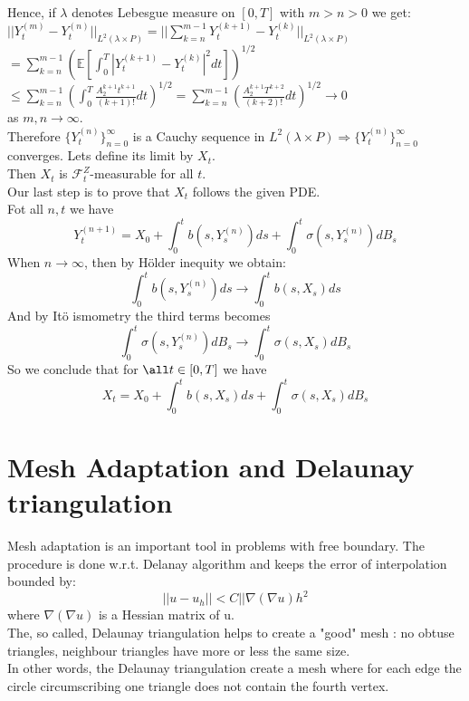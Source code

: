 \documentclass[a4paper]{report}
\begin{document}
\begin{itemize}
Hence, if $\lambda$ denotes Lebesgue measure on $[0,T]$ with $m>n>0$ we get:\\
$||Y_t^{(m)}- Y_t^{(n)}||_{L^2(\lambda \times P)} = ||\sum_{k=n}^{m-1} Y_t^{(k+1)} -Y_t^{(k)} ||_{L^2(\lambda \times P)}$\\
$= \sum_{k=n}^{m-1} (\mathbb{E}[\int_0^T |Y_t^{(k+1)} - Y_t^{(k)} |^2 dt])^{1/2}$\\
$ \leq \sum_{k=n}^{m-1} ( \int_0^T   \frac{A_2^{k+1}t^{k+1}}{(k+1)!} dt)^{1/2} = \sum_{k=n}^{m-1} (  \frac{A_2^{k+1}T^{k+2}}{(k+2)!} dt)^{1/2} \longrightarrow 0$\\
as $m,n \longrightarrow\infty$.\\
\newline
Therefore $ \{Y_t^{(n)} \}^\infty_{n=0}$ is a Cauchy sequence in $L^2(\lambda \times P) \Rightarrow  \{Y_t^{(n)} \}^\infty_{n=0}$ converges. Lets define its limit by $X_t$.\\
Then $X_t$ is $\mathcal{F}_t^Z$-measurable for all $t$.\\
Our last step is to prove that $X_t$ follows the given PDE.\\
Fot all $n,t$ we have 
\begin{equation}
Y_t^{(n+1)} =X_0+\int_0^t b(s,Y_s^{(n)})ds+\int_0^t \sigma (s,Y_s^{(n)})dB_s
\end{equation}
When $n\longrightarrow \infty$, then by Hölder inequity we obtain:
\begin{equation}
\int_0^t b(s,Y_s^{(n)})ds \longrightarrow \int_0^t b(s,X_s)ds
\end{equation}
And by Itö ismometry the third terms becomes
\begin{equation}
\int_0^t \sigma(s,Y_s^{(n)})dB_s \longrightarrow \int_0^t \sigma (s,X_s)dB_s
\end{equation}
So we conclude that for $\all t \in [0,T]$ we have
\begin{equation}
X_t=X_0 + \int_0^t b(s,X_s)ds + \int_0^t \sigma (s, X_s)dB_s
\end{equation}
\square
\section{Mesh Adaptation and Delaunay triangulation}
Mesh adaptation is an important tool in problems with free boundary. The procedure is done w.r.t. Delanay algorithm and keeps the error of interpolation bounded by:
\begin{equation}
||u-u_h||<C|| \nabla ( \nabla u)h^2
\end{equation}
where $\nabla (\nabla u)$ is a Hessian matrix of u.\\
The, so called, Delaunay triangulation helps to create a "good" mesh : no obtuse triangles, neighbour triangles have more or less the same size.\\
In other words, the Delaunay triangulation create a mesh where for each edge the circle circumscribing one triangle does not contain the fourth vertex.


\end{itemize}
\end{document}
